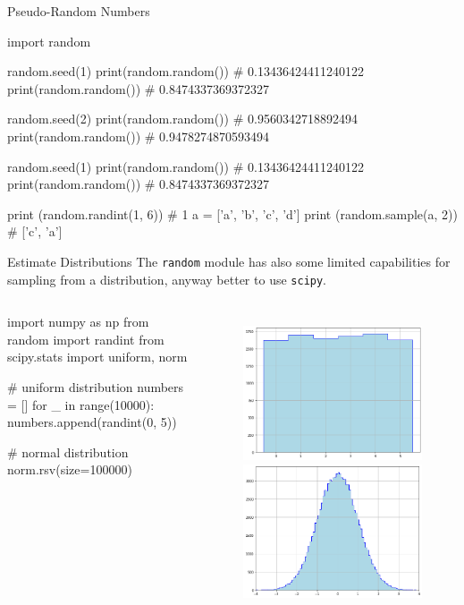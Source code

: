 \documentclass{beamer}
\begin{document}
\begin{frame}[fragile]{Pseudo-Random Numbers}  
\begin{ipython}
import random 

random.seed(1)
print(random.random())       # 0.13436424411240122
print(random.random())       # 0.8474337369372327

random.seed(2)
print(random.random())       # 0.9560342718892494
print(random.random())       # 0.9478274870593494

random.seed(1)
print(random.random())       # 0.13436424411240122
print(random.random())       # 0.8474337369372327

print (random.randint(1, 6)) # 1
a = ['a', 'b', 'c', 'd']
print (random.sample(a, 2))  # ['c', 'a']
\end{ipython}
\end{frame}

\begin{frame}[fragile]{Estimate Distributions}
The \texttt{random} module has also some limited capabilities for sampling from a distribution, anyway 
better to use \texttt{scipy}.

\begin{columns}
\begin{ipython}
import numpy as np
from random import randint
from scipy.stats import uniform, norm

# uniform distribution
numbers = []
for _ in range(10000):
    numbers.append(randint(0, 5))

# normal distribution
norm.rsv(size=100000)   
\end{ipython}
\begin{figure}[h]
    \begin{center}
    \includegraphics[width=0.55\linewidth]{uniform_distro}\\
    \includegraphics[width=0.55\linewidth]{gauss_distro}
    \end{center}
\end{figure}    
\end{columns}
\end{frame}
\end{document}
